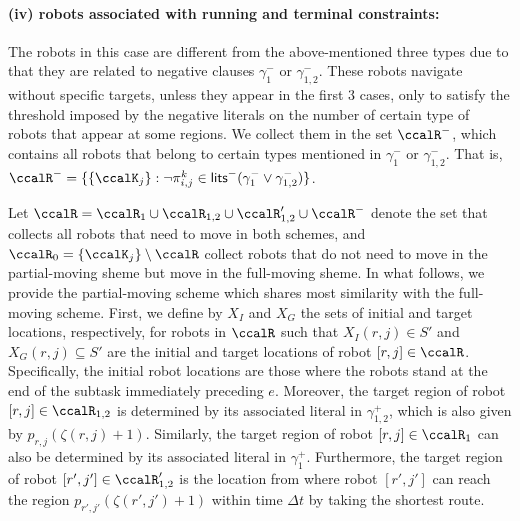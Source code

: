\documentclass[Afour,sageh,times]{sagej}
\renewcommand{\ap}[3]{\mathcal{\pi}_{{#1},{#2}}^{#3}}
\begin{document}
{{\paragraph{(iv) robots associated with running and terminal constraints:} The robots in this case  are different from the above-mentioned three types due to that they are related to negative clauses $\gamma_1^-$ or $\gamma_{1,2}^-$. These robots navigate without specific targets, unless they appear in the first 3 cases, only to satisfy the threshold imposed by the negative literals on the number of certain type of robots that appear at some regions. We collect them in the set $\ccalR^-$, which contains all robots that belong to certain types mentioned in $\gamma_1^-$ or $\gamma_{1,2}^-$. That is, $\ccalR^- = \{\{\ccalK_j\}: \neg \ap{i}{j}{k} \in \mathsf{lits}^- (\gamma_1^-  \vee \gamma_{1,2}^-) \}$.

Let $\ccalR = \ccalR_1 \cup\ccalR_{1,2}  \cup \ccalR'_{1,2} \cup \ccalR^-$ denote the set that collects all robots that need to move in both schemes, and $\ccalR_0 = \{\ccalK_j\}\setminus\ccalR$ collect robots that do not need to move in the partial-moving sheme but move in the full-moving sheme. In what follows, we provide the partial-moving scheme which shares most similarity with the full-moving scheme. First, we define by $X_I$ and $X_G$ the sets of initial and target locations, respectively, for robots in $\ccalR$  such that $X_I(r,j) \in S'$ and $X_G(r,j)\subseteq S'$ are the initial  and target locations of robot $[r,j] \in \ccalR$. Specifically, the initial robot locations are those where the robots stand at the end of the subtask immediately preceding $e$. Moreover, the target region of  robot $[r,j] \in \ccalR_{1,2}$ is determined  by its associated literal in $\gamma_{1,2}^+$, which is also given by  $p_{r,j}(\zeta(r,j)+1)$. Similarly, the target region of robot $[r,j] \in \ccalR_{1}$ can also be determined by its associated literal in $\gamma_1^+$. Furthermore, the target region of robot $[r',j'] \in \ccalR'_{1,2}$ is the  location from where robot $[r',j']$ can reach the region $p_{r',j'}(\zeta(r',j')+1)$ within time $\Delta t$ by taking the shortest route.

}}
\end{document}
